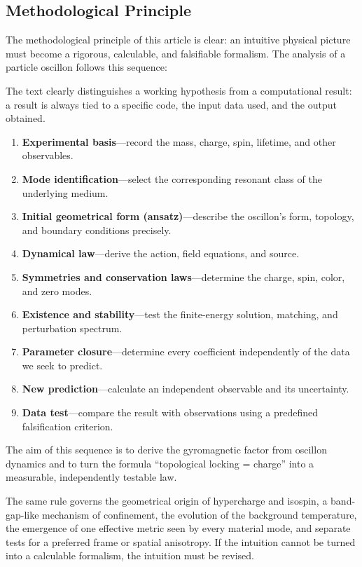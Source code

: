 \documentclass[11pt,a4paper]{article}
\begin{document}
\subsection{Methodological Principle}

The methodological principle of this article is clear: an intuitive physical picture must become a rigorous, calculable, and falsifiable formalism. The analysis of a particle oscillon follows this sequence:

The text clearly distinguishes a working hypothesis from a computational result: a result is always tied to a specific code, the input data used, and the output obtained.

\begin{enumerate}
\item \textbf{Experimental basis}---record the mass, charge, spin, lifetime, and other observables.
\item \textbf{Mode identification}---select the corresponding resonant class of the underlying medium.
\item \textbf{Initial geometrical form (ansatz)}---describe the oscillon's form, topology, and boundary conditions precisely.
\item \textbf{Dynamical law}---derive the action, field equations, and source.
\item \textbf{Symmetries and conservation laws}---determine the charge, spin, color, and zero modes.
\item \textbf{Existence and stability}---test the finite-energy solution, matching, and perturbation spectrum.
\item \textbf{Parameter closure}---determine every coefficient independently of the data we seek to predict.
\item \textbf{New prediction}---calculate an independent observable and its uncertainty.
\item \textbf{Data test}---compare the result with observations using a predefined falsification criterion.
\end{enumerate}

The aim of this sequence is to derive the gyromagnetic factor from oscillon dynamics and to turn the formula “topological locking = charge” into a measurable, independently testable law.

The same rule governs the geometrical origin of hypercharge and isospin, a band-gap-like mechanism of confinement, the evolution of the background temperature, the emergence of one effective metric seen by every material mode, and separate tests for a preferred frame or spatial anisotropy. If the intuition cannot be turned into a calculable formalism, the intuition must be revised.
\end{document}
